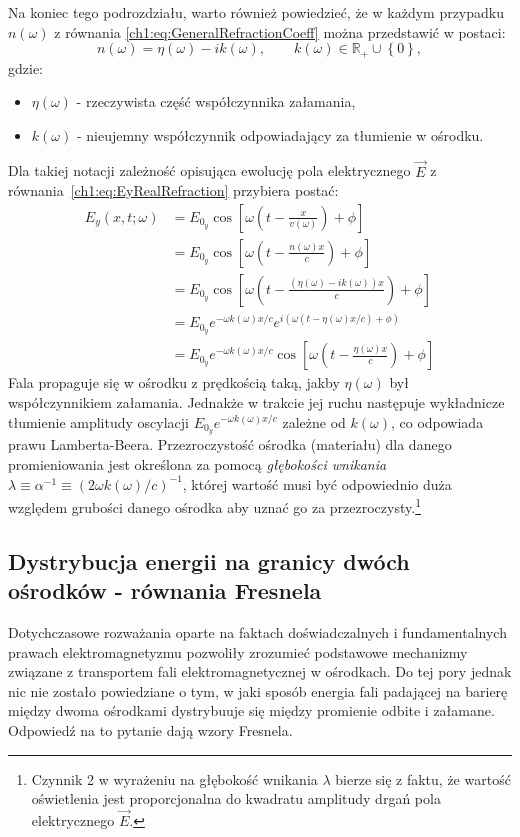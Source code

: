 Na koniec tego podrozdziału, warto również powiedzieć, że w każdym przypadku $n(\omega)$ z równania \eqref{ch1:eq:GeneralRefractionCoeff} można przedstawić w postaci:
\begin{equation}
n(\omega) = \eta(\omega) - ik(\omega),\qquad k(\omega)\in\mathbb{R_+}\cup\left\lbrace 0 \right\rbrace,
\label{ch1:eq:SimplifiedRefractionCoeff}
\end{equation}
gdzie:
\begin{itemize}
\item[] $\eta(\omega)$ - rzeczywista część współczynnika załamania,
\item[] $k(\omega)$ - nieujemny współczynnik odpowiadający za tłumienie w ośrodku.
\end{itemize}
Dla takiej notacji zależność opisująca ewolucję pola elektrycznego $\vec{E}$ z równania~\eqref{ch1:eq:EyRealRefraction} przybiera postać:
\begin{align}
E_y(x,t; \omega) 	&= E_{0_y}\cos\left[\omega\left(t - \frac{x}{v(\omega)} \right) + \phi \right]\nonumber\\
					&= E_{0_y}\cos\left[\omega\left(t - \frac{n(\omega)x}{c} \right) + \phi \right]\nonumber\\
					&= E_{0_y}\cos\left[\omega\left(t - \frac{(\eta(\omega) - ik(\omega))x}{c} \right) + \phi \right]\nonumber\\
					&= E_{0_y}e^{-\omega k(\omega)x/c}e^{i\left(\omega\left(t - \eta(\omega)x/c \right) + \phi \right)}\nonumber\\
					&= E_{0_y}e^{-\omega k(\omega)x/c}\cos\left[\omega\left(t - \frac{\eta(\omega)x}{c} \right) + \phi \right]
\end{align}
Fala propaguje się w ośrodku z prędkością taką, jakby $\eta(\omega)$ był współczynnikiem załamania. Jednakże w trakcie jej ruchu następuje wykładnicze tłumienie amplitudy oscylacji $E_{0_y}e^{-\omega k(\omega)x/c}$ zależne od $k(\omega)$, co odpowiada prawu Lamberta-Beera. Przezroczystość ośrodka (materiału) dla danego promieniowania jest określona za pomocą \textit{głębokości wnikania} $\lambda\equiv\alpha^{-1}\equiv \left(2\omega k(\omega)/c\right)^{-1}$, której wartość musi być odpowiednio duża względem grubości danego ośrodka aby uznać go za przezroczysty.\footnote{Czynnik 2 w wyrażeniu na głębokość wnikania $\lambda$ bierze się z faktu, że wartość oświetlenia jest proporcjonalna do kwadratu amplitudy drgań pola elektrycznego $\vec{E}$.}

\subsection{Dystrybucja energii na granicy dwóch ośrodków - równania Fresnela}
Dotychczasowe rozważania oparte na faktach doświadczalnych i fundamentalnych prawach elektromagnetyzmu pozwoliły zrozumieć podstawowe mechanizmy związane z transportem fali elektromagnetycznej w ośrodkach. Do tej pory jednak nic nie zostało powiedziane o tym, w jaki sposób energia fali padającej na barierę między dwoma ośrodkami dystrybuuje się między promienie odbite i załamane. Odpowiedź na to pytanie dają wzory Fresnela.

